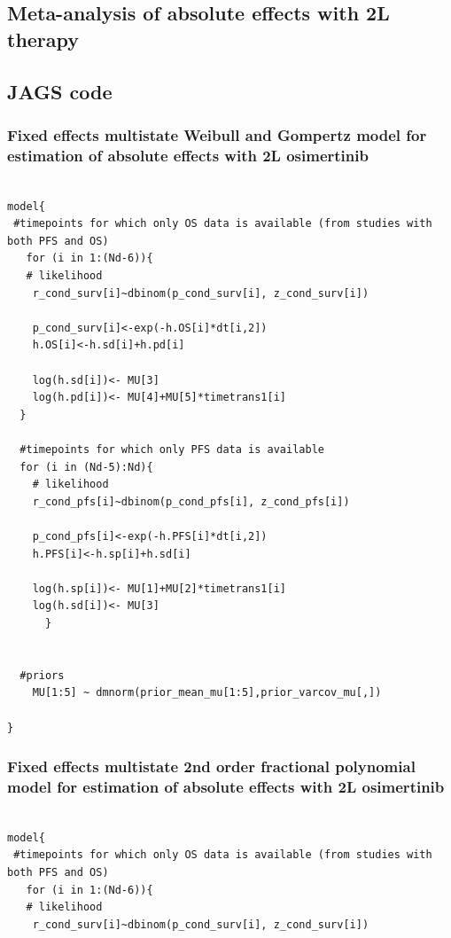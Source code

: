 \documentclass[11pt,final,fleqn]{article}\usepackage[]{graphicx}\usepackage[]{color}
\theoremstyle{plain}
\begin{document}
\begin{appendices}
\section{Meta-analysis of absolute effects with 2L therapy}
\subsection{JAGS code}\label{sec:2l-jags}

\subsubsection{Fixed effects multistate Weibull and Gompertz model for estimation of absolute effects with 2L osimertinib}  
\begin{verbatim} 

model{
 #timepoints for which only OS data is available (from studies with both PFS and OS)
   for (i in 1:(Nd-6)){
   # likelihood
    r_cond_surv[i]~dbinom(p_cond_surv[i], z_cond_surv[i]) 
    
    p_cond_surv[i]<-exp(-h.OS[i]*dt[i,2])
    h.OS[i]<-h.sd[i]+h.pd[i]
    
    log(h.sd[i])<- MU[3] 
    log(h.pd[i])<- MU[4]+MU[5]*timetrans1[i]
  }
    
  #timepoints for which only PFS data is available 
  for (i in (Nd-5):Nd){
    # likelihood
    r_cond_pfs[i]~dbinom(p_cond_pfs[i], z_cond_pfs[i]) 
    
    p_cond_pfs[i]<-exp(-h.PFS[i]*dt[i,2])
    h.PFS[i]<-h.sp[i]+h.sd[i]
    
    log(h.sp[i])<- MU[1]+MU[2]*timetrans1[i]
    log(h.sd[i])<- MU[3] 
      }
  
  
  #priors
    MU[1:5] ~ dmnorm(prior_mean_mu[1:5],prior_varcov_mu[,]) 
  
}

\end{verbatim}

\subsubsection{Fixed effects multistate 2nd order fractional polynomial model for estimation of absolute effects with 2L osimertinib} 
\begin{verbatim} 

model{
 #timepoints for which only OS data is available (from studies with both PFS and OS)
   for (i in 1:(Nd-6)){
   # likelihood
    r_cond_surv[i]~dbinom(p_cond_surv[i], z_cond_surv[i]) 
    

\end{verbatim}
\end{appendices}
\end{document}
